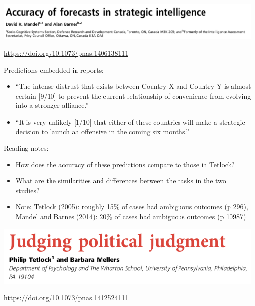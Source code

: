\documentclass[aspectratio=169]{beamer}
\begin{document}
\begin{frame}

\begin{center}
\includegraphics[width=\textwidth]{figures/mandel_accuracy_2014_title}
\end{center}

\vfill
\url{https://doi.org/10.1073/pnas.1406138111}

\end{frame}
\begin{frame}

Predictions embedded in reports:
\begin{itemize}
\item ``The intense distrust that exists between Country X and Country Y is almost certain [9/10] to prevent the current relationship of convenience from evolving into a stronger alliance.''
\item ``It is very unlikely [1/10] that either of these countries will make a strategic decision to launch an offensive in the coming six months.''
\end{itemize}

\end{frame}
\begin{frame}

Reading notes:
\begin{itemize}
\item How does the accuracy of these predictions compare to those in Tetlock?
\pause
\item What are the similarities and differences between the tasks in the two studies? 
\pause
\item Note: Tetlock (2005): roughly 15\% of cases had ambiguous outcomes (p 296), Mandel and Barnes (2014): 20\% of cases had ambiguous outcomes (p 10987)
\end{itemize}

\end{frame}
\begin{frame}

\begin{center}
\includegraphics[width=\textwidth]{figures/tetlock_judging_2014_title}
\end{center}

\vfill
\url{https://doi.org/10.1073/pnas.1412524111}

\end{frame}
\end{document}
